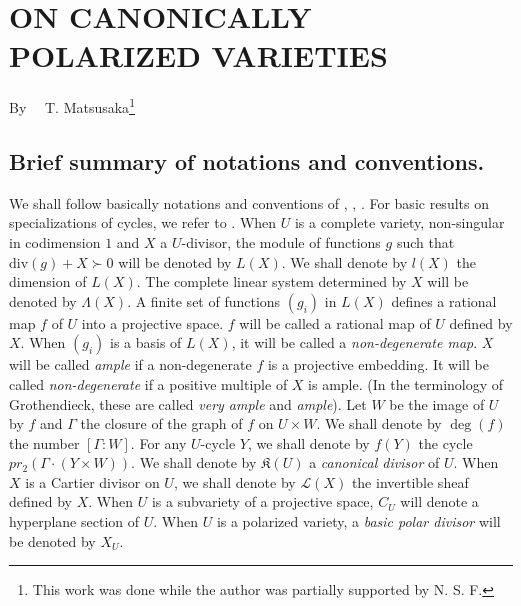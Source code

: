 \chapter[\textsc{T. Matsusaka~:} On Canonically Polarized Varieties]{ON CANONICALLY POLARIZED VARIETIES}\label{art14}

\begin{center}
By~~ T. Matsusaka\footnote{This work was done while the author was partially supported by N. S. F.}
\end{center}

\setcounter{pageoriginal}{264}
\section*{Brief summary of notations and conventions.}
\pageoriginale


We shall follow basically notations and conventions of \cite{art14-key21}, \cite{art14-key25}, \cite{art14-key32}. For basic results on specializations of cycles, we refer to \cite{art14-key24}. When $U$ is a complete variety, non-singular in codimension $1$ and $X$ a $U$-divisor, the module of functions $g$ such that $\text{div} (g)+X\succ 0$ will be denoted by $L(X)$. We shall denote by $l(X)$ the dimension of $L(X)$. The complete linear system determined by $X$ will be denoted by $\Lambda(X)$. A finite set of functions $(g_{i})$ in $L(X)$ defines a rational map $f$ of $U$ into a projective space. $f$ will be called a {\rm rational map of $U$ defined by $X$.} When $(g_{i})$ is a basis of $L(X)$, it will be called a {\em non-degenerate map}. $X$ will be called {\em ample} if a non-degenerate $f$ is a projective embedding. It will be called {\em non-degenerate} if a positive multiple of $X$ is ample. (In the terminology of Grothendieck, these are called {\em very ample} and {\em ample}). Let $W$ be the image of $U$ by $f$ and $\Gamma$ the closure of the graph of $f$ on $U\times W$. We shall denote by $\deg (f)$ the number $[\Gamma:W]$. For any $U$-cycle $Y$, we shall denote by $f(Y)$ the cycle $pr_{2}(\Gamma\cdot (Y\times W))$. We shall denote by $\mathfrak{K}(U)$  a {\em canonical divisor} of $U$. When $X$ is a Cartier divisor on $U$, we shall denote by $\mathscr{L}(X)$ the invertible sheaf defined by $X$. When $U$ is a subvariety of a projective space, $C_{U}$ will denote a hyperplane section of $U$. When $U$ is a polarized variety, a {\em basic polar divisor} will be denoted by $X_{U}$.

